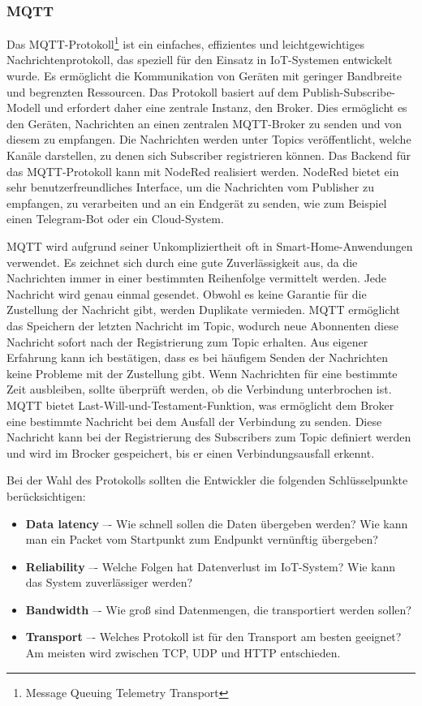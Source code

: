 \documentclass[12pt, letterpaper]{article}
\begin{document}
\subsubsection{MQTT}
\par Das MQTT-Protokoll\footnote[1]{Message Queuing Telemetry Transport} ist ein einfaches, effizientes und leichtgewichtiges Nachrichtenprotokoll, das speziell für den Einsatz in IoT-Systemen entwickelt wurde. Es ermöglicht die Kommunikation von Geräten mit geringer Bandbreite und begrenzten Ressourcen. Das Protokoll basiert auf dem Publish-Subscribe-Modell und erfordert daher eine zentrale Instanz, den Broker. Dies ermöglicht es den Geräten, Nachrichten an einen zentralen MQTT-Broker zu senden und von diesem zu empfangen. Die Nachrichten werden unter Topics veröffentlicht, welche Kanäle darstellen, zu denen sich Subscriber registrieren können. Das Backend für das MQTT-Protokoll kann mit NodeRed realisiert werden. NodeRed bietet ein sehr benutzerfreundliches Interface, um die Nachrichten vom Publisher zu empfangen, zu verarbeiten und an ein Endgerät zu senden, wie zum Beispiel einen Telegram-Bot oder ein Cloud-System.
\par MQTT wird aufgrund seiner Unkompliziertheit oft in Smart-Home-Anwendungen verwendet. Es zeichnet sich durch eine gute Zuverlässigkeit aus, da die Nachrichten immer in einer bestimmten Reihenfolge vermittelt werden. Jede Nachricht wird genau einmal gesendet. Obwohl es keine Garantie für die Zustellung der Nachricht gibt, werden Duplikate vermieden. MQTT ermöglicht das Speichern der letzten Nachricht im Topic, wodurch neue Abonnenten diese Nachricht sofort nach der Registrierung zum Topic erhalten. Aus eigener Erfahrung kann ich bestätigen, dass es bei häufigem Senden der Nachrichten keine Probleme mit der Zustellung gibt. Wenn Nachrichten für eine bestimmte Zeit ausbleiben, sollte überprüft werden, ob die Verbindung unterbrochen ist. MQTT bietet Last-Will-und-Testament-Funktion, was ermöglicht dem Broker eine bestimmte Nachricht bei dem Ausfall der Verbindung zu senden. Diese Nachricht kann bei der Registrierung des Subscribers zum Topic definiert werden und wird im Brocker gespeichert, bis er einen Verbindungsausfall erkennt.
\par Bei der Wahl des Protokolls sollten die Entwickler die folgenden Schlüsselpunkte berücksichtigen:
\begin{itemize}
  \item[\textbullet] \textbf{Data latency} –- Wie schnell sollen die Daten übergeben werden? Wie kann man ein Packet vom Startpunkt zum Endpunkt vernünftig übergeben?
  \item[\textbullet] \textbf{Reliability} –- Welche Folgen hat Datenverlust im IoT-System? Wie kann das System zuverlässiger werden?
  \item[\textbullet] \textbf{Bandwidth} –- Wie groß sind Datenmengen, die transportiert werden sollen?
  \item[\textbullet] \textbf{Transport} –- Welches Protokoll ist für den Transport am besten geeignet? Am meisten wird zwischen TCP, UDP und HTTP entschieden.
\end{itemize}
\end{document}
